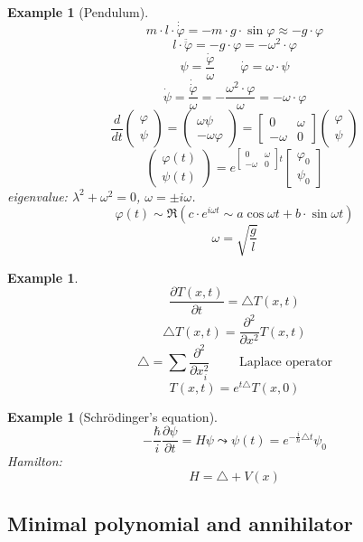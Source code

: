 \documentclass{article}
\newcounter{lecref}[section]
\numberwithin{lecref}{section}
\newtheorem{example}[lecref]{Example}
\newcommand{\vectwo}[2]{\begin{pmatrix} #1 \\ #2 \end{pmatrix}}
\begin{document}
\begin{example}[Pendulum]
  \[ m \cdot l \cdot \dot{\dot{\varphi}} = -m \cdot g \cdot \sin{\varphi} \approx -g \cdot \varphi \]
  \[ l \cdot \ddot{\ddot{\varphi}} = -g \cdot \varphi = -\omega^2 \cdot \varphi \]
  \[ \psi = \frac{\dot{\varphi}}{\omega} \qquad \dot{\varphi} = \omega \cdot \psi \]
  \[ \dot{\psi} = \frac{\dot{\dot{\varphi}}}{\omega} = -\frac{\omega^2 \cdot \varphi}{\omega} = -\omega \cdot \varphi \]
  \[ \frac{d}{dt} \vectwo{\varphi}{\psi} = \vectwo{\omega \psi}{-\omega \varphi} = \begin{bmatrix} 0 & \omega \\ -\omega & 0 \end{bmatrix} \vectwo{\varphi}{\psi} \]
  \[ \begin{pmatrix} \varphi(t) \\ \psi(t) \end{pmatrix} = e^{\begin{bmatrix} 0 & \omega \\ -\omega & 0 \end{bmatrix} t} \begin{bmatrix} \varphi_0 \\ \psi_0 \end{bmatrix} \]
  eigenvalue: $\lambda^2 + \omega^2 = 0$, $\omega = \pm i\omega$.
  \[ \varphi(t) \sim \Re(c \cdot e^{i \omega t} \sim a \cos{\omega t} + b \cdot \sin{\omega t}) \]
  \[ \omega = \sqrt{\frac{g}{l}} \]
\end{example}

\begin{example}
  \[ \frac{\partial T(x,t)}{\partial t} = \triangle T(x, t) \]
  \[ \triangle T(x, t) = \frac{\partial^2}{\partial x^2} T(x, t) \]
  \[ \triangle = \sum \frac{\partial^2}{\partial x_i^2} \qquad \text{ Laplace operator} \]
  \[ T(x, t) = e^{t \triangle} T(x, 0) \]
\end{example}

\begin{example}[Schr\"odinger's equation]
  \[ -\frac{\hbar}{i} \frac{\partial \psi}{\partial t} = H\psi \leadsto \psi(t) = e^{-\frac i{\hbar} \triangle t} \psi_0 \]
  Hamilton:
  \[ H = \triangle + V(x) \]
\end{example}

\subsection{Minimal polynomial and annihilator}
\end{document}
